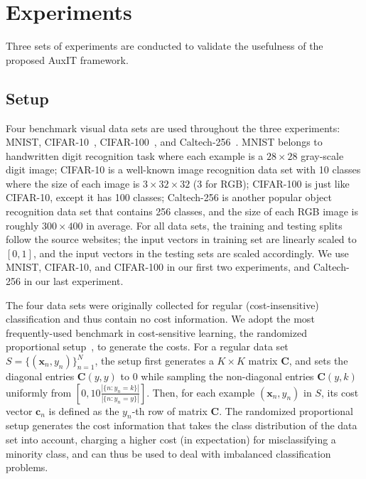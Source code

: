 \documentclass[a4paper]{article}
\begin{document}
\section{Experiments}
  \label{sec:exp}
  Three sets of experiments are conducted to validate the usefulness of the proposed AuxIT framework.

\subsection{Setup}
  \label{sec:setup}
  Four benchmark visual data sets are used throughout the three experiments: MNIST, CIFAR-10~\cite{Krizhevsky09}, CIFAR-100~\cite{Krizhevsky09}, and Caltech-256~\cite{griffin2007caltech}.
  MNIST belongs to handwritten digit recognition task where each example is a $28 \times 28$ gray-scale digit image; CIFAR-10 is a well-known image recognition data set with 10 classes where the size of each image is $3 \times 32 \times 32$ (3 for RGB); CIFAR-100 is just like CIFAR-10, except it has 100 classes; Caltech-256 is another popular object recognition data set that contains 256 classes, and the size of each RGB image is roughly $300 \times 400$ in average.
  For all data sets, the training and testing splits follow the source websites; the input vectors in training set are linearly scaled to $[0, 1]$, and the input vectors in the testing sets are scaled accordingly.
  We use MNIST, CIFAR-10, and CIFAR-100 in our first two experiments, and Caltech-256 in our last experiment.

  The four data sets were originally collected for regular (cost-insensitive) classification and thus contain no cost information.
  We adopt the most frequently-used benchmark in cost-sensitive learning, the randomized proportional setup~\cite{abe2004iterative}, to generate the costs.
  For a regular data set $S = \{(\mathbf{x}_{n}, y_{n})\}_{n = 1} ^ {N}$, the setup first generates a $K \times K$ matrix $\mathbf{C}$, and sets the diagonal entries $\mathbf{C}(y, y)$ to 0 while sampling the non-diagonal entries $\mathbf{C}(y, k)$ uniformly from $[0, 10\frac{|\{n: y_{n} = k\}|}{|\{n: y_{n} = y\}|}]$.
  Then, for each example $(\mathbf{x}_{n}, y_{n})$ in $S$, its cost vector $\mathbf{c}_{n}$ is defined as the $y_{n}$-th row of matrix $\mathbf{C}$.
  The randomized proportional setup generates the cost information that takes the class distribution of the data set into account, charging a higher cost (in expectation) for misclassifying a minority class, and can thus be used to deal with imbalanced classification problems.
\end{document}
